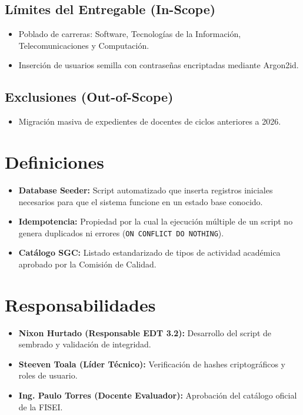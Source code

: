 \documentclass[12pt,a4paper]{article}
\begin{document}
\subsection{Límites del Entregable (In-Scope)}
\begin{itemize}[leftmargin=1.5em, itemsep=2pt]
    \item Poblado de carreras: Software, Tecnologías de la Información, Telecomunicaciones y Computación.
    \item Inserción de usuarios semilla con contraseñas encriptadas mediante Argon2id.
\end{itemize}
\subsection{Exclusiones (Out-of-Scope)}
\begin{itemize}[leftmargin=1.5em, itemsep=2pt]
    \item Migración masiva de expedientes de docentes de ciclos anteriores a 2026.
\end{itemize}

\section{Definiciones}
\begin{itemize}[leftmargin=1.5em, itemsep=2pt]
    \item \textbf{Database Seeder:} Script automatizado que inserta registros iniciales necesarios para que el sistema funcione en un estado base conocido.
    \item \textbf{Idempotencia:} Propiedad por la cual la ejecución múltiple de un script no genera duplicados ni errores (\texttt{ON CONFLICT DO NOTHING}).
    \item \textbf{Catálogo SGC:} Listado estandarizado de tipos de actividad académica aprobado por la Comisión de Calidad.
\end{itemize}

\section{Responsabilidades}
\begin{itemize}[leftmargin=1.5em, itemsep=2pt]
    \item \textbf{Nixon Hurtado (Responsable EDT 3.2):} Desarrollo del script de sembrado y validación de integridad.
    \item \textbf{Steeven Toala (Líder Técnico):} Verificación de hashes criptográficos y roles de usuario.
    \item \textbf{Ing. Paulo Torres (Docente Evaluador):} Aprobación del catálogo oficial de la FISEI.
\end{itemize}
\end{document}
